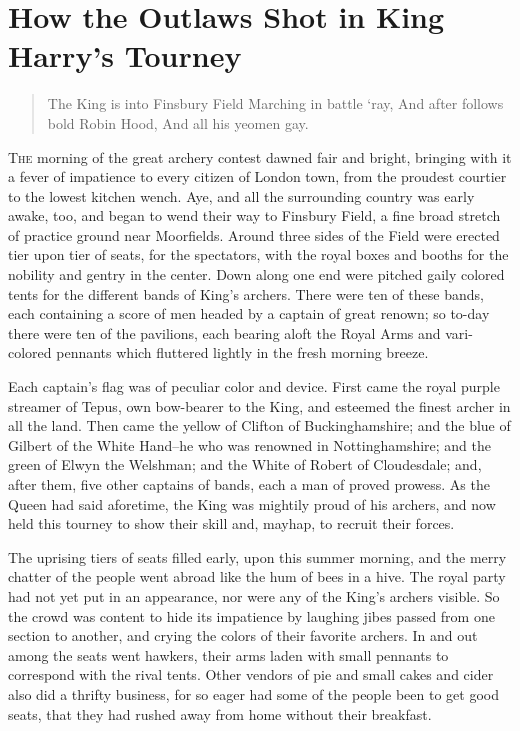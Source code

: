 \chapter{How the Outlaws Shot in King Harry’s Tourney}

\begin{quote}
The King is into Finsbury Field
Marching in battle ‘ray,
And after follows bold Robin Hood,
And all his yeomen gay.
\end{quote}

\lettrine{T}{he} morning of the great archery contest dawned fair and bright,
bringing with it a fever of impatience to every citizen of London town,
from the proudest courtier to the lowest kitchen wench. Aye, and all the
surrounding country was early awake, too, and began to wend their way to
Finsbury Field, a fine broad stretch of practice ground near Moorfields.
Around three sides of the Field were erected tier upon tier of seats,
for the spectators, with the royal boxes and booths for the nobility and
gentry in the center. Down along one end were pitched gaily colored
tents for the different bands of King's archers. There were ten of these
bands, each containing a score of men headed by a captain of great
renown; so to-day there were ten of the pavilions, each bearing aloft
the Royal Arms and vari-colored pennants which fluttered lightly in the
fresh morning breeze.

Each captain's flag was of peculiar color and device. First came the
royal purple streamer of Tepus, own bow-bearer to the King, and esteemed
the finest archer in all the land. Then came the yellow of Clifton of
Buckinghamshire; and the blue of Gilbert of the White Hand--he who was
renowned in Nottinghamshire; and the green of Elwyn the Welshman; and
the White of Robert of Cloudesdale; and, after them, five other captains
of bands, each a man of proved prowess. As the Queen had said aforetime,
the King was mightily proud of his archers, and now held this tourney to
show their skill and, mayhap, to recruit their forces.

The uprising tiers of seats filled early, upon this summer morning, and
the merry chatter of the people went abroad like the hum of bees in a
hive. The royal party had not yet put in an appearance, nor were any of
the King's archers visible. So the crowd was content to hide its
impatience by laughing jibes passed from one section to another, and
crying the colors of their favorite archers. In and out among the seats
went hawkers, their arms laden with small pennants to correspond with
the rival tents. Other vendors of pie and small cakes and cider also did
a thrifty business, for so eager had some of the people been to get good
seats, that they had rushed away from home without their breakfast.

